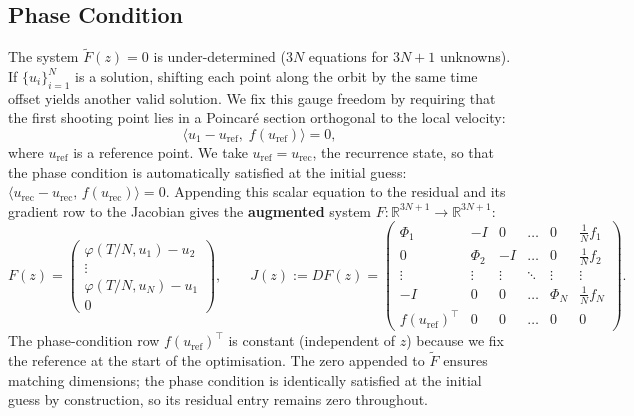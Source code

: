 \documentclass[11pt,a4paper]{article}
\begin{document}
\subsection{Phase Condition}
The system $\tilde{F}(z) = 0$ is under-determined ($3N$ equations for $3N+1$
unknowns).  If $\{u_i\}_{i=1}^N$ is a solution, shifting each point along the
orbit by the same time offset yields another valid solution.  We fix this
gauge freedom by requiring that the first shooting point lies in a
Poincar\'{e} section orthogonal to the local velocity:
\begin{equation}\label{eq:phase_condition}
  \langle u_1 - u_{\text{ref}},\; f(u_{\text{ref}}) \rangle = 0,
\end{equation}
where $u_{\text{ref}}$ is a reference point.  We take
$u_{\text{ref}} = u_{\text{rec}}$, the recurrence state, so that the phase
condition is automatically satisfied at the initial guess:
$\langle u_{\text{rec}} - u_{\text{rec}},\, f(u_{\text{rec}}) \rangle = 0$.
Appending this scalar equation to the residual and its
gradient row to the Jacobian gives the \textbf{augmented} system
$F: \mathbb{R}^{3N+1} \to \mathbb{R}^{3N+1}$:
\begin{equation}\label{eq:augmented_residual}
  F(z) =
  \begin{pmatrix}
    \varphi(T/N, u_1) - u_2 \\
    \vdots \\
    \varphi(T/N, u_N) - u_1 \\
    0
  \end{pmatrix},
  \qquad
  J(z) := DF(z) =
  \begin{pmatrix}
    \Phi_1 & -I & 0      & \dots  & 0      & \frac{1}{N}f_1 \\[4pt]
    0      & \Phi_2 & -I & \dots  & 0      & \frac{1}{N}f_2 \\[4pt]
    \vdots & \vdots & \vdots & \ddots & \vdots & \vdots \\[4pt]
    -I     & 0      & 0      & \dots  & \Phi_N & \frac{1}{N}f_N \\[4pt]
    f(u_{\text{ref}})^\top & 0 & 0 & \dots & 0 & 0
  \end{pmatrix}.
\end{equation}
The phase-condition row $f(u_{\text{ref}})^\top$ is constant (independent of
$z$) because we fix the reference at the start of the optimisation.  The zero
appended to $\tilde{F}$ ensures matching dimensions; the phase condition is
identically satisfied at the initial guess by construction, so its residual
entry remains zero throughout.
\end{document}
